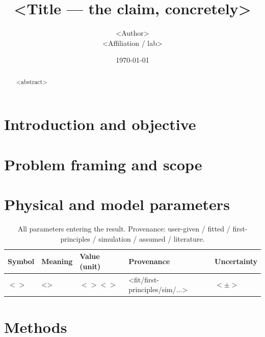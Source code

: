 \documentclass[11pt]{article}
\title{\textbf{<Title — the claim, concretely>}}
\author{<Author> \\ \small <Affiliation / lab>}
\date{\today}
\begin{document}
\maketitle

\begin{abstract}
<abstract>
\end{abstract}

\section{Introduction and objective}\label{sec:intro}

\section{Problem framing and scope}\label{sec:scope}

\section{Physical and model parameters}\label{sec:params}
\begin{table}[t]
  \centering
  \caption{All parameters entering the result. Provenance: user-given / fitted / first-principles /
    simulation / assumed / literature.}
  \label{tab:params}
  \begin{tabular}{lllll}
    \toprule
    Symbol & Meaning & Value (unit) & Provenance & Uncertainty \\
    \midrule
    $<>$ & <> & $<>\unit{<>}$ & <fit/first-principles/sim/...> & $<\pm>$ \\
    \bottomrule
  \end{tabular}
\end{table}

\section{Methods}\label{sec:methods}
\end{document}
